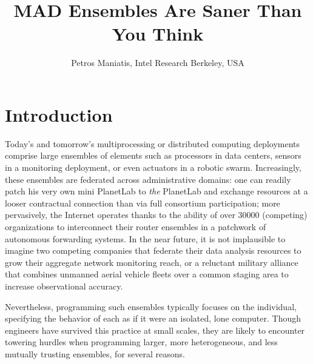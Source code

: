 \documentclass[faircopy]{sig-alternate}
\begin{document}

\title{MAD Ensembles Are Saner Than You Think}
\author{Petros Maniatis, Intel Research Berkeley, USA}
\date{}

\maketitle






\section{Introduction}

Today's and tomorrow's multiprocessing or distributed computing
deployments comprise large ensembles of elements such as processors in
data centers, sensors in a monitoring deployment, or even actuators in a robotic
swarm.  Increasingly, these ensembles are federated across
administrative domains: one can readily
patch his very own mini PlanetLab to \emph{the} PlanetLab and exchange
resources at a looser contractual connection than via full consortium participation;
more pervasively, the Internet operates thanks to the ability of over
30000 (competing) organizations to interconnect their router ensembles
in a patchwork of autonomous forwarding systems.  In the near future, it is not implausible to
imagine two competing companies that federate their data analysis resources to
grow their aggregate network monitoring reach, or a reluctant military
alliance that combines unmanned aerial vehicle fleets over a common
staging area to increase observational accuracy.

Nevertheless, programming such ensembles typically focuses on the individual,
specifying the behavior of each as if it were an isolated, lone
computer.  Though engineers have survived this practice at small
scales, they are likely to encounter towering hurdles when
programming larger, more heterogeneous, and less mutually trusting
ensembles, for several reasons.
\end{document}
